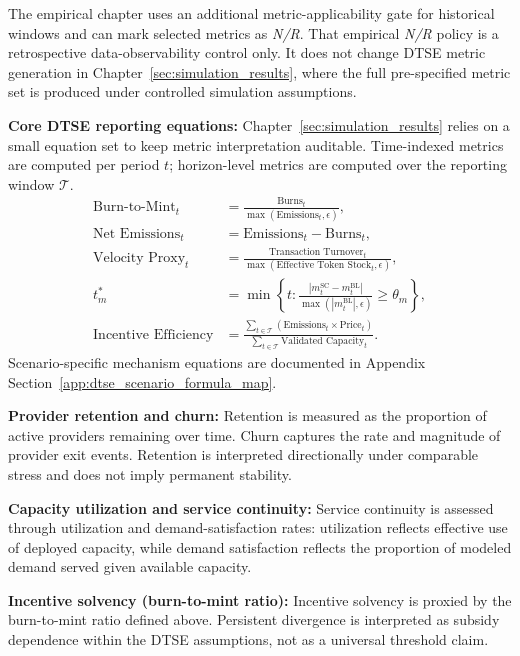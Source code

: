 The empirical chapter uses an additional metric-applicability gate for historical windows and can mark selected metrics as \emph{N/R}. That empirical \emph{N/R} policy is a retrospective data-observability control only. It does not change DTSE metric generation in Chapter~\ref{sec:simulation_results}, where the full pre-specified metric set is produced under controlled simulation assumptions.

\noindent\textbf{Core DTSE reporting equations:}
Chapter~\ref{sec:simulation_results} relies on a small equation set to keep metric interpretation auditable. Time-indexed metrics are computed per period \(t\); horizon-level metrics are computed over the reporting window \(\mathcal{T}\).
\begin{align*}
\text{Burn-to-Mint}_t &= \frac{\text{Burns}_t}{\max(\text{Emissions}_t,\epsilon)}, \\
\text{Net Emissions}_t &= \text{Emissions}_t - \text{Burns}_t, \\
\text{Velocity Proxy}_t &= \frac{\text{Transaction Turnover}_t}{\max(\text{Effective Token Stock}_t,\epsilon)}, \\
t_m^* &= \min \left\{ t : \frac{\left|m_t^{\mathrm{SC}}-m_t^{\mathrm{BL}}\right|}{\max\!\left(\left|m_t^{\mathrm{BL}}\right|,\epsilon\right)} \ge \theta_m \right\}, \\
\text{Incentive Efficiency} &= \frac{\sum_{t \in \mathcal{T}} (\text{Emissions}_t \times \text{Price}_t)}{\sum_{t \in \mathcal{T}} \text{Validated Capacity}_t}.
\end{align*}
Scenario-specific mechanism equations are documented in Appendix Section~\ref{app:dtse_scenario_formula_map}.

\noindent\textbf{Provider retention and churn:}
Retention is measured as the proportion of active providers remaining over time. Churn captures the rate and magnitude of provider exit events. Retention is interpreted directionally under comparable stress and does not imply permanent stability.

\noindent\textbf{Capacity utilization and service continuity:}
Service continuity is assessed through utilization and demand-satisfaction rates: utilization reflects effective use of deployed capacity, while demand satisfaction reflects the proportion of modeled demand served given available capacity.

\noindent\textbf{Incentive solvency (burn-to-mint ratio):}
Incentive solvency is proxied by the burn-to-mint ratio defined above. Persistent divergence is interpreted as subsidy dependence within the DTSE assumptions, not as a universal threshold claim.

